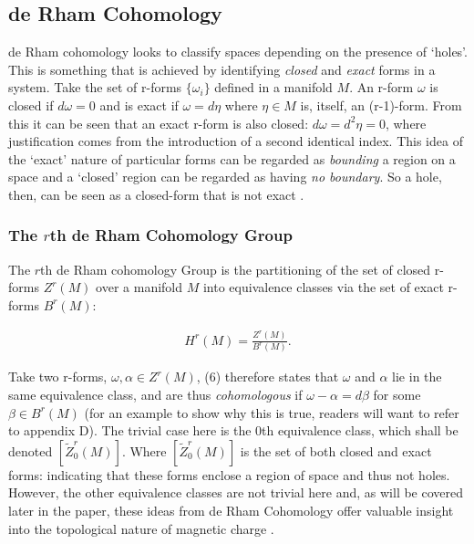 \documentclass[fleqn, twocolumn, 10pt]{article}
\begin{document}

\subsection{de Rham Cohomology}
de Rham cohomology looks to classify spaces depending on the presence of `holes'. This is something that is achieved by identifying \textit{closed} and \textit{exact} forms in a  system. Take the set of r-forms $\{\omega_i\}$ defined in a manifold $M$. An r-form $\omega$ is closed if $d\omega = 0$ and is exact if $\omega = d\eta$ where $\eta \in M$ is, itself, an (r-1)-form. From this it can be seen that an exact r-form is also closed: $d\omega = d^2\eta = 0$, where justification comes from the introduction of a second identical index. This idea of the `exact' nature of particular forms can be regarded as \textit{bounding} a region on a space and a `closed' region can be regarded as having \textit{no boundary}. So a hole, then, can be seen as a closed-form that is not exact \cite{greene2009rham}.

\subsubsection{The $r$th de Rham Cohomology Group}

The $r$th de Rham cohomology Group is the partitioning of the set of closed r-forms $Z^r(M)$ over a manifold $M$ into equivalence classes via the set of exact r-forms $B^r(M)$:

\begin{ceqn}
\begin{align}\tag{6}
H^r(M) = \frac{Z^r(M)}{B^r(M)}.
\end{align}
\end{ceqn}
Take two r-forms, $\omega, \alpha \in Z^r(M)$, (6) therefore states that $\omega$ and $\alpha$ lie in the same equivalence class, and are thus \textit{cohomologous} if $\omega - \alpha = d\beta$ for some $\beta \in B^r(M)$ (for an example to show why this is true, readers will want to refer to appendix D). The trivial case here is the $0$th equivalence class, which shall be denoted $[\widetilde{Z}^r_0(M)]$. Where $[\widetilde{Z}^r_0(M)]$ is the set of both closed and exact forms: indicating that these forms enclose a region of space and thus not holes. However, the other equivalence classes are not trivial here and, as will be covered later in the paper, these ideas from de Rham Cohomology offer valuable insight into the topological nature of magnetic charge \cite{nakahara2003geometry, kai2015lam, naber1997topology}.
\end{document}
